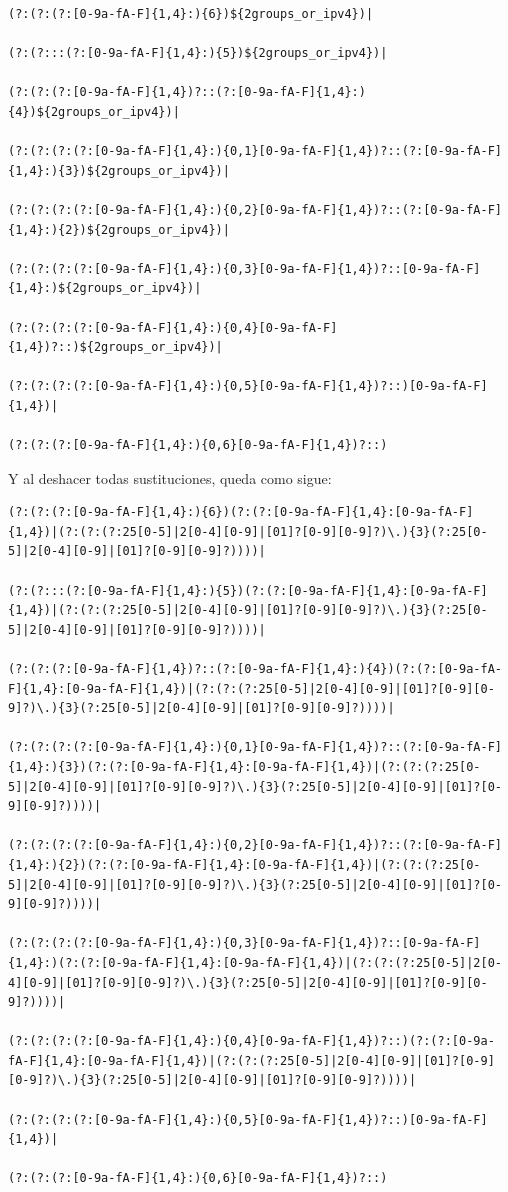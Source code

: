 \begin{lstlisting}[breaklines, caption={Expresiones regulares IPv6 con sustituciones}, captionpos=b]
(?:(?:(?:[0-9a-fA-F]{1,4}:){6})${2groups_or_ipv4})|

(?:(?:::(?:[0-9a-fA-F]{1,4}:){5})${2groups_or_ipv4})|

(?:(?:(?:[0-9a-fA-F]{1,4})?::(?:[0-9a-fA-F]{1,4}:){4})${2groups_or_ipv4})|

(?:(?:(?:(?:[0-9a-fA-F]{1,4}:){0,1}[0-9a-fA-F]{1,4})?::(?:[0-9a-fA-F]{1,4}:){3})${2groups_or_ipv4})|

(?:(?:(?:(?:[0-9a-fA-F]{1,4}:){0,2}[0-9a-fA-F]{1,4})?::(?:[0-9a-fA-F]{1,4}:){2})${2groups_or_ipv4})|

(?:(?:(?:(?:[0-9a-fA-F]{1,4}:){0,3}[0-9a-fA-F]{1,4})?::[0-9a-fA-F]{1,4}:)${2groups_or_ipv4})|

(?:(?:(?:(?:[0-9a-fA-F]{1,4}:){0,4}[0-9a-fA-F]{1,4})?::)${2groups_or_ipv4})|

(?:(?:(?:(?:[0-9a-fA-F]{1,4}:){0,5}[0-9a-fA-F]{1,4})?::)[0-9a-fA-F]{1,4})|

(?:(?:(?:[0-9a-fA-F]{1,4}:){0,6}[0-9a-fA-F]{1,4})?::)
\end{lstlisting}

Y al deshacer todas sustituciones, queda como sigue:
\begin{lstlisting}[breaklines, caption={Expresiones regulares IPv6 sin sustituciones}, captionpos=b]
(?:(?:(?:[0-9a-fA-F]{1,4}:){6})(?:(?:[0-9a-fA-F]{1,4}:[0-9a-fA-F]{1,4})|(?:(?:(?:25[0-5]|2[0-4][0-9]|[01]?[0-9][0-9]?)\.){3}(?:25[0-5]|2[0-4][0-9]|[01]?[0-9][0-9]?))))|

(?:(?:::(?:[0-9a-fA-F]{1,4}:){5})(?:(?:[0-9a-fA-F]{1,4}:[0-9a-fA-F]{1,4})|(?:(?:(?:25[0-5]|2[0-4][0-9]|[01]?[0-9][0-9]?)\.){3}(?:25[0-5]|2[0-4][0-9]|[01]?[0-9][0-9]?))))|

(?:(?:(?:[0-9a-fA-F]{1,4})?::(?:[0-9a-fA-F]{1,4}:){4})(?:(?:[0-9a-fA-F]{1,4}:[0-9a-fA-F]{1,4})|(?:(?:(?:25[0-5]|2[0-4][0-9]|[01]?[0-9][0-9]?)\.){3}(?:25[0-5]|2[0-4][0-9]|[01]?[0-9][0-9]?))))|

(?:(?:(?:(?:[0-9a-fA-F]{1,4}:){0,1}[0-9a-fA-F]{1,4})?::(?:[0-9a-fA-F]{1,4}:){3})(?:(?:[0-9a-fA-F]{1,4}:[0-9a-fA-F]{1,4})|(?:(?:(?:25[0-5]|2[0-4][0-9]|[01]?[0-9][0-9]?)\.){3}(?:25[0-5]|2[0-4][0-9]|[01]?[0-9][0-9]?))))|

(?:(?:(?:(?:[0-9a-fA-F]{1,4}:){0,2}[0-9a-fA-F]{1,4})?::(?:[0-9a-fA-F]{1,4}:){2})(?:(?:[0-9a-fA-F]{1,4}:[0-9a-fA-F]{1,4})|(?:(?:(?:25[0-5]|2[0-4][0-9]|[01]?[0-9][0-9]?)\.){3}(?:25[0-5]|2[0-4][0-9]|[01]?[0-9][0-9]?))))|

(?:(?:(?:(?:[0-9a-fA-F]{1,4}:){0,3}[0-9a-fA-F]{1,4})?::[0-9a-fA-F]{1,4}:)(?:(?:[0-9a-fA-F]{1,4}:[0-9a-fA-F]{1,4})|(?:(?:(?:25[0-5]|2[0-4][0-9]|[01]?[0-9][0-9]?)\.){3}(?:25[0-5]|2[0-4][0-9]|[01]?[0-9][0-9]?))))|

(?:(?:(?:(?:[0-9a-fA-F]{1,4}:){0,4}[0-9a-fA-F]{1,4})?::)(?:(?:[0-9a-fA-F]{1,4}:[0-9a-fA-F]{1,4})|(?:(?:(?:25[0-5]|2[0-4][0-9]|[01]?[0-9][0-9]?)\.){3}(?:25[0-5]|2[0-4][0-9]|[01]?[0-9][0-9]?))))|

(?:(?:(?:(?:[0-9a-fA-F]{1,4}:){0,5}[0-9a-fA-F]{1,4})?::)[0-9a-fA-F]{1,4})|

(?:(?:(?:[0-9a-fA-F]{1,4}:){0,6}[0-9a-fA-F]{1,4})?::)
\end{lstlisting}

